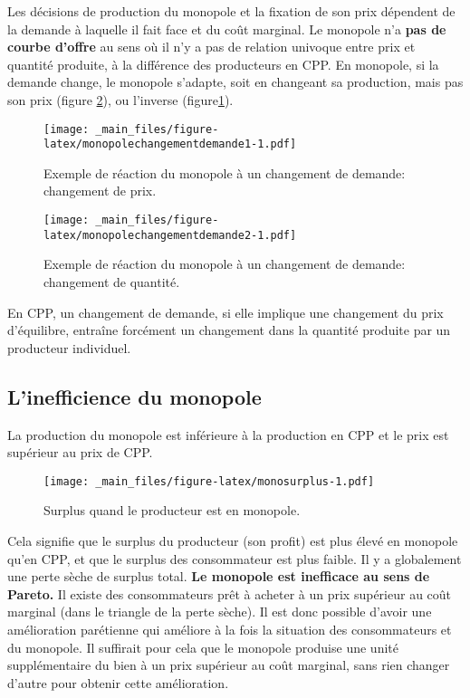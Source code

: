 \documentclass[
]{book}
\theoremstyle{definition}
\theoremstyle{definition}
\theoremstyle{definition}
\theoremstyle{definition}
\theoremstyle{remark}
\begin{document}
Les décisions de production du monopole et la fixation de son prix dépendent de la demande à laquelle il fait face et du coût marginal.
Le monopole n'a \textbf{pas de courbe d'offre} au sens où il n'y a pas de relation univoque entre prix et quantité produite, à la différence des producteurs en CPP.
En monopole, si la demande change, le monopole s'adapte, soit en changeant sa production, mais pas son prix (figure \ref{fig:monopolechangementdemande2}), ou l'inverse (figure\ref{fig:monopolechangementdemande1}).

\begin{figure}
\centering
\texttt{[image: \_main\_files/figure-latex/monopolechangementdemande1-1.pdf]}
\caption{\label{fig:monopolechangementdemande1}Exemple de réaction du monopole à un changement de demande: changement de prix.}
\end{figure}

\begin{figure}
\centering
\texttt{[image: \_main\_files/figure-latex/monopolechangementdemande2-1.pdf]}
\caption{\label{fig:monopolechangementdemande2}Exemple de réaction du monopole à un changement de demande: changement de quantité.}
\end{figure}

En CPP, un changement de demande, si elle implique une changement du prix d'équilibre, entraîne forcément un changement dans la quantité produite par un producteur individuel.

\hypertarget{linefficience-du-monopole}{%
\subsection{L'inefficience du monopole}\label{linefficience-du-monopole}}

La production du monopole est inférieure à la production en CPP et le prix est supérieur au prix de CPP.

\begin{figure}
\centering
\texttt{[image: \_main\_files/figure-latex/monosurplus-1.pdf]}
\caption{\label{fig:monosurplus}Surplus quand le producteur est en monopole.}
\end{figure}

Cela signifie que le surplus du producteur (son profit) est plus élevé en monopole qu'en CPP, et que le surplus des consommateur est plus faible.
Il y a globalement une perte sèche de surplus total.
\textbf{Le monopole est inefficace au sens de Pareto.}
Il existe des consommateurs prêt à acheter à un prix supérieur au coût marginal (dans le triangle de la perte sèche).
Il est donc possible d'avoir une amélioration parétienne qui améliore à la fois la situation des consommateurs et du monopole.
Il suffirait pour cela que le monopole produise une unité supplémentaire du bien à un prix supérieur au coût marginal, sans rien changer d'autre pour obtenir cette amélioration.
\end{document}

